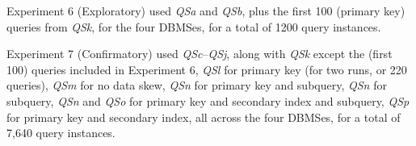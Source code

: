 \documentclass[prodmode,acmtods]{acmsmall}
\begin{document}
Experiment 6 (Exploratory) used {\em QSa} and {\em QSb}, plus the first 100 (primary
key) queries from {\em QSk}, for the four DBMSes, for a total of 1200 query
instances.

Experiment 7 (Confirmatory) used {\em QSc}--{\em QSj},
along with {\em QSk} except the (first 100) queries included in Experiment 6,
{\em QSl} for primary key (for two runs, or 220 queries),
{\em QSm} for no data skew,
{\em QSn} for primary key and subquery,
{\em QSn} for subquery,
{\em QSn} and {\em QSo} for primary key and secondary index and subquery,
{\em QSp} for primary key and secondary index,
all across the four DBMSes, for a total of 7,640 query instances.

\end{document}
